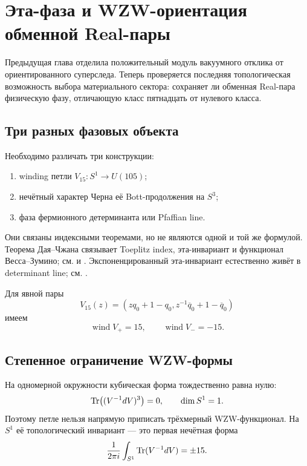 \chapter{Эта-фаза и WZW-ориентация обменной Real-пары}

Предыдущая глава отделила положительный модуль вакуумного отклика от
ориентированного суперследа. Теперь проверяется последняя топологическая
возможность выбора материального сектора: сохраняет ли обменная Real-пара
физическую фазу, отличающую класс пятнадцать от нулевого класса.

\section{Три разных фазовых объекта}

Необходимо различать три конструкции:
\begin{enumerate}
 \item winding петли $V_{15}:S^1\to U(105)$;
 \item нечётный характер Черна её Bott-продолжения на $S^3$;
 \item фаза фермионного детерминанта или Pfaffian line.
\end{enumerate}
Они связаны индексными теоремами, но не являются одной и той же формулой.
Теорема Дая--Чжана связывает Toeplitz index, эта-инвариант и функционал
Весса--Зумино; см.  и
. Экспоненцированный эта-инвариант естественно живёт
в determinant line; см. .

Для явной пары
\begin{equation}
 V_{15}(z)=\left(
 zq_0+1-q_0,
 z^{-1}\overline q_0+1-\overline q_0
 \right)
\end{equation}
имеем
\begin{equation}
 \operatorname{wind}V_+=15,
 \qquad
 \operatorname{wind}V_-=-15.
 \label{eq:v5-real-pair-windings}
\end{equation}

\section{Степенное ограничение WZW-формы}

На одномерной окружности кубическая форма тождественно равна нулю:
\begin{equation}
 \operatorname{Tr}\bigl((V^{-1}dV)^3\bigr)=0,
 \qquad \dim S^1=1.
\end{equation}
Поэтому петле нельзя напрямую приписать трёхмерный WZW-функционал. На
$S^1$ её топологический инвариант --- это первая нечётная форма
\begin{equation}
 \frac{1}{2\pi i}\int_{S^1}\operatorname{Tr}(V^{-1}dV)=\pm15.
\end{equation}

